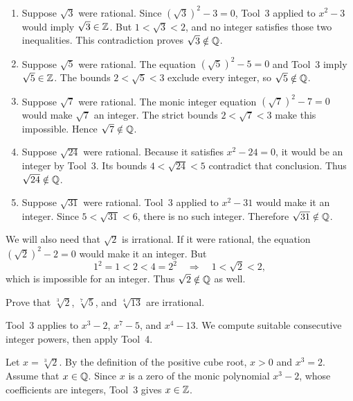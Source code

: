 \begin{enumerate}[label=(\alph*)]
\item Suppose $\sqrt3$ were rational. Since
$(\sqrt3)^2-3=0$, Tool~3 applied to $x^2-3$ would imply
$\sqrt3\in\mathbb{Z}$. But $1<\sqrt3<2$, and no integer satisfies those
two inequalities. This contradiction proves $\sqrt3\notin\mathbb{Q}$.

\item Suppose $\sqrt5$ were rational. The equation
$(\sqrt5)^2-5=0$ and Tool~3 imply $\sqrt5\in\mathbb{Z}$. The bounds
$2<\sqrt5<3$ exclude every integer, so $\sqrt5\notin\mathbb{Q}$.

\item Suppose $\sqrt7$ were rational. The monic integer equation
$(\sqrt7)^2-7=0$ would make $\sqrt7$ an integer. The strict bounds
$2<\sqrt7<3$ make this impossible. Hence $\sqrt7\notin\mathbb{Q}$.

\item Suppose $\sqrt{24}$ were rational. Because it satisfies
$x^2-24=0$, it would be an integer by Tool~3. Its bounds
$4<\sqrt{24}<5$ contradict that conclusion. Thus
$\sqrt{24}\notin\mathbb{Q}$.

\item Suppose $\sqrt{31}$ were rational. Tool~3 applied to
$x^2-31$ would make it an integer. Since $5<\sqrt{31}<6$, there is
no such integer. Therefore $\sqrt{31}\notin\mathbb{Q}$.
\end{enumerate}

We will also need that $\sqrt2$ is irrational. If it were rational,
the equation $(\sqrt2)^2-2=0$ would make it an integer. But
\[
 1^2=1<2<4=2^2
 \quad\Longrightarrow\quad 1<\sqrt2<2,
\]
which is impossible for an integer. Thus $\sqrt2\notin\mathbb{Q}$ as well.


\goal Prove that $\sqrt[3]{2}$, $\sqrt[7]{5}$, and $\sqrt[4]{13}$
are irrational.

\idea Tool~3 applies to $x^3-2$, $x^7-5$, and $x^4-13$.
We compute suitable consecutive integer powers, then apply Tool~4.

Let $x=\sqrt[3]{2}$. By the definition of the positive cube root,
$x>0$ and $x^3=2$. Assume that $x\in\mathbb{Q}$. Since $x$ is a zero of
the monic polynomial $x^3-2$, whose coefficients are integers,
Tool~3 gives $x\in\mathbb{Z}$.

